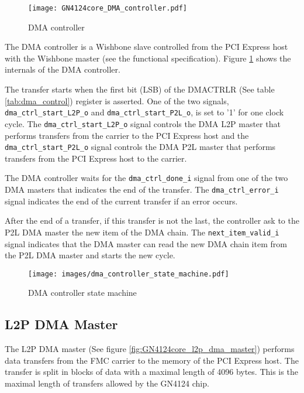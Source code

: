 \documentclass[10pt,a4paper]{cerndoc}
\begin{document}
\begin{figure}[!ht]
  \centering
  \texttt{[image: GN4124core\_DMA\_controller.pdf]}
  \caption{DMA controller}
  \label{fig:GN4124core_dma_ctrl}
\end{figure}

The DMA controller is a Wishbone slave controlled from the PCI Express host with the Wishbone master (see the functional specification). Figure \ref{fig:GN4124core_dma_ctrl} shows the internals of the DMA controller.

The transfer starts when the first bit (LSB) of the DMACTRLR (See table  \ref{tab:dma_control}) register is asserted. One of the two signals, \verb+dma_ctrl_start_L2P_o+ and \verb+dma_ctrl_start_P2L_o+, is set to '1' for one clock cycle. The \verb+dma_ctrl_start_L2P_o+ signal controls the DMA L2P master that performs transfers from the carrier to the PCI Express host and the \verb+dma_ctrl_start_P2L_o+ signal controls the DMA P2L master that performs transfers from the PCI Express host to the carrier.

The DMA controller waits for the \verb+dma_ctrl_done_i+ signal from one of the two DMA masters that indicates the end of the transfer. The \verb+dma_ctrl_error_i+ signal indicates the end of the current transfer if an error occurs.

After the end of a transfer, if this transfer is not the last, the controller ask to the P2L DMA master the new item of the DMA chain. The \verb+next_item_valid_i+ signal indicates that the DMA master can read the new DMA chain item from the P2L DMA master and starts the new cycle.




\begin{figure}[!ht]
  \centering
  \texttt{[image: images/dma\_controller\_state\_machine.pdf]}
  \caption{DMA controller state machine}
  \label{fig:GN4124core_dma_ctrl_state_machine}
\end{figure}



  \subsection{L2P DMA Master}
The L2P DMA master (See figure \ref{fig:GN4124core_l2p_dma_master}) performs data transfers from the FMC carrier to the memory of the PCI Express host. The transfer is split in blocks of data with a maximal length of 4096 bytes. This is the maximal length of transfers allowed by the GN4124 chip.
\end{document}
